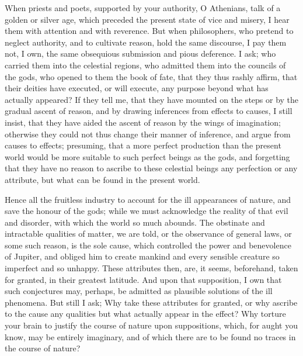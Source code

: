 \documentclass[]{article}
\begin{document}
\begin{sectionbody}
\humeparagraph  When priests and poets, supported by your authority, O Athenians, talk of a golden or silver age, which preceded the present state of vice and misery, I hear them with attention and with reverence. But when philosophers, who pretend to neglect authority, and to cultivate reason, hold the same discourse, I pay them not, I own, the same obsequious submission and pious deference. I ask; who carried them into the celestial regions, who admitted them into the councils of the gods, who opened to them the book of fate, that they thus rashly affirm, that their deities have executed, or will execute, any purpose beyond what has actually appeared? If they tell me, that they have mounted on the steps or by the gradual ascent of reason, and by drawing inferences from effects to causes, I still insist, that they have aided the ascent of reason by the wings of imagination; otherwise they could not thus change their manner of inference, and argue from causes to effects; presuming, that a more perfect production than the present world would be more suitable to such perfect beings as the gods, and forgetting that they have no reason to ascribe to these celestial beings any perfection or any attribute, but what can be found in the present world.

\humeparagraph  Hence all the fruitless industry to account for the ill appearances of nature, and save the honour of the gods; while we must acknowledge the reality of that evil and disorder, with which the world so much abounds. The obstinate and intractable qualities of matter, we are told, or the observance of general laws, or some such reason, is the sole cause, which controlled the power and benevolence of Jupiter, and obliged him to create mankind and every sensible creature so imperfect and so unhappy. These attributes then, are, it seems, beforehand, taken for granted, in their greatest latitude. And upon that supposition, I own that such conjectures may, perhaps, be admitted as plausible solutions of the ill phenomena. But still I ask; Why take these attributes for granted, or why ascribe to the cause any qualities but what actually appear in the effect? Why torture your brain to justify the course of nature upon suppositions, which, for aught you know, may be entirely imaginary, and of which there are to be found no traces in the course of nature?


\end{sectionbody}
\end{document}
